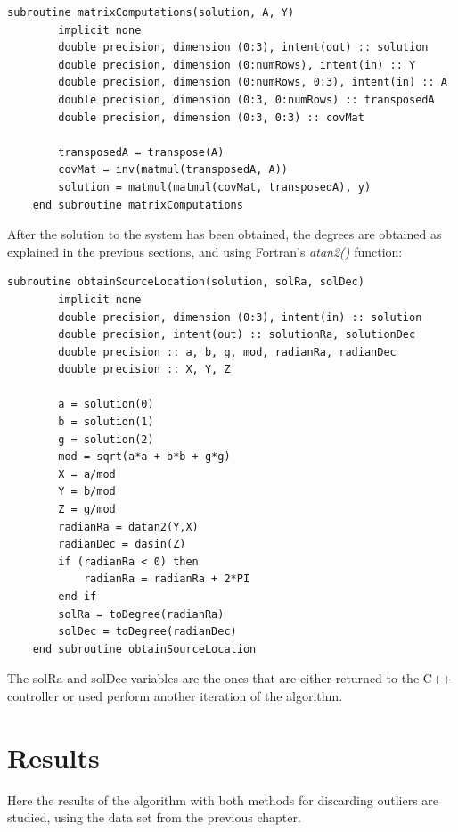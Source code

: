 \begin{minipage}{\linewidth}
	\label{lst:solveSystem}
	\begin{lstlisting}[style=myFortranStyle, caption=Function matrixComputations to solve the system]
	subroutine matrixComputations(solution, A, Y)
		implicit none
		double precision, dimension (0:3), intent(out) :: solution
		double precision, dimension (0:numRows), intent(in) :: Y
		double precision, dimension (0:numRows, 0:3), intent(in) :: A
		double precision, dimension (0:3, 0:numRows) :: transposedA
		double precision, dimension (0:3, 0:3) :: covMat
		
		transposedA = transpose(A)
		covMat = inv(matmul(transposedA, A))
		solution = matmul(matmul(covMat, transposedA), y)
	end subroutine matrixComputations\end{lstlisting}
\end{minipage}

After the solution to the system has been obtained, the degrees are obtained as explained in the previous sections, and using Fortran's \textit{atan2()} function:

\begin{minipage}{\linewidth}
	\label{lst:obtainSource}
	\begin{lstlisting}[style=myFortranStyle, caption=Function obtainSourceLocation]
	subroutine obtainSourceLocation(solution, solRa, solDec)
		implicit none
		double precision, dimension (0:3), intent(in) :: solution
		double precision, intent(out) :: solutionRa, solutionDec
		double precision :: a, b, g, mod, radianRa, radianDec
		double precision :: X, Y, Z
		
		a = solution(0)
		b = solution(1)
		g = solution(2)
		mod = sqrt(a*a + b*b + g*g)
		X = a/mod
		Y = b/mod
		Z = g/mod
		radianRa = datan2(Y,X)
		radianDec = dasin(Z)
		if (radianRa < 0) then
			radianRa = radianRa + 2*PI
		end if
		solRa = toDegree(radianRa)
		solDec = toDegree(radianDec)
	end subroutine obtainSourceLocation\end{lstlisting}
\end{minipage}

The solRa and solDec variables are the ones that are either returned to the C++ controller or used perform another iteration of the algorithm.

\section{Results}

Here the results of the algorithm with both methods for discarding outliers are studied, using the data set from the previous chapter.

